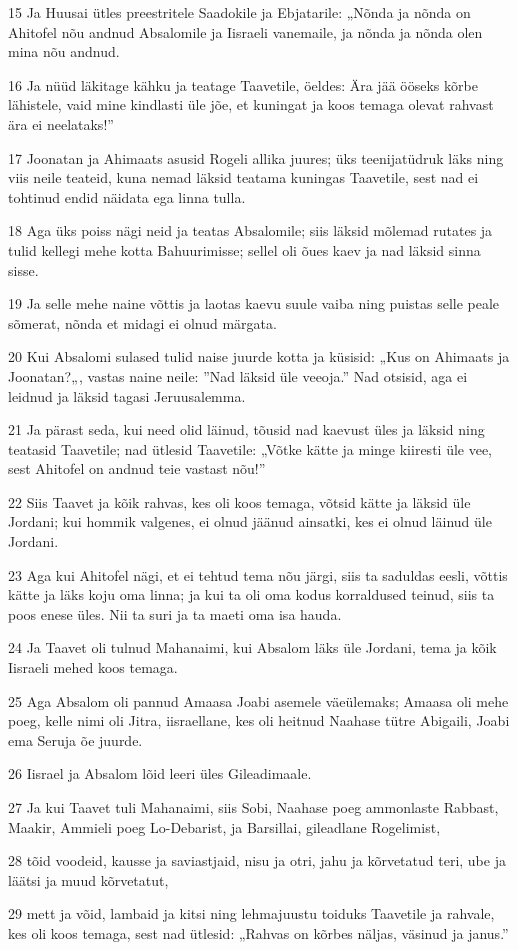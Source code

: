 \par 15 Ja Huusai ütles preestritele Saadokile ja Ebjatarile: „Nõnda ja nõnda on Ahitofel nõu andnud Absalomile ja Iisraeli vanemaile, ja nõnda ja nõnda olen mina nõu andnud.
\par 16 Ja nüüd läkitage kähku ja teatage Taavetile, öeldes: Ära jää ööseks kõrbe lähistele, vaid mine kindlasti üle jõe, et kuningat ja koos temaga olevat rahvast ära ei neelataks!”
\par 17 Joonatan ja Ahimaats asusid Rogeli allika juures; üks teenijatüdruk läks ning viis neile teateid, kuna nemad läksid teatama kuningas Taavetile, sest nad ei tohtinud endid näidata ega linna tulla.
\par 18 Aga üks poiss nägi neid ja teatas Absalomile; siis läksid mõlemad rutates ja tulid kellegi mehe kotta Bahuurimisse; sellel oli õues kaev ja nad läksid sinna sisse.
\par 19 Ja selle mehe naine võttis ja laotas kaevu suule vaiba ning puistas selle peale sõmerat, nõnda et midagi ei olnud märgata.
\par 20 Kui Absalomi sulased tulid naise juurde kotta ja küsisid: „Kus on Ahimaats ja Joonatan?„, vastas naine neile: ”Nad läksid üle veeoja.” Nad otsisid, aga ei leidnud ja läksid tagasi Jeruusalemma.
\par 21 Ja pärast seda, kui need olid läinud, tõusid nad kaevust üles ja läksid ning teatasid Taavetile; nad ütlesid Taavetile: „Võtke kätte ja minge kiiresti üle vee, sest Ahitofel on andnud teie vastast nõu!”
\par 22 Siis Taavet ja kõik rahvas, kes oli koos temaga, võtsid kätte ja läksid üle Jordani; kui hommik valgenes, ei olnud jäänud ainsatki, kes ei olnud läinud üle Jordani.
\par 23 Aga kui Ahitofel nägi, et ei tehtud tema nõu järgi, siis ta saduldas eesli, võttis kätte ja läks koju oma linna; ja kui ta oli oma kodus korraldused teinud, siis ta poos enese üles. Nii ta suri ja ta maeti oma isa hauda.
\par 24 Ja Taavet oli tulnud Mahanaimi, kui Absalom läks üle Jordani, tema ja kõik Iisraeli mehed koos temaga.
\par 25 Aga Absalom oli pannud Amaasa Joabi asemele väeülemaks; Amaasa oli mehe poeg, kelle nimi oli Jitra, iisraellane, kes oli heitnud Naahase tütre Abigaili, Joabi ema Seruja õe juurde.
\par 26 Iisrael ja Absalom lõid leeri üles Gileadimaale.
\par 27 Ja kui Taavet tuli Mahanaimi, siis Sobi, Naahase poeg ammonlaste Rabbast, Maakir, Ammieli poeg Lo-Debarist, ja Barsillai, gileadlane Rogelimist,
\par 28 tõid voodeid, kausse ja saviastjaid, nisu ja otri, jahu ja kõrvetatud teri, ube ja läätsi ja muud kõrvetatut,
\par 29 mett ja võid, lambaid ja kitsi ning lehmajuustu toiduks Taavetile ja rahvale, kes oli koos temaga, sest nad ütlesid: „Rahvas on kõrbes näljas, väsinud ja janus.”

